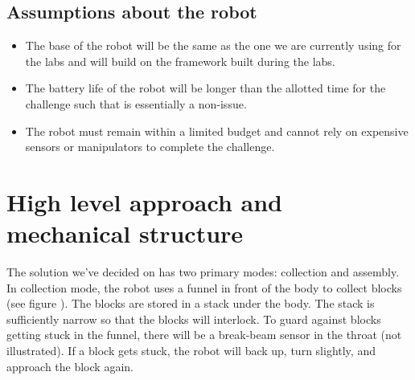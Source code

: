 \documentclass[letterpaper,11pt]{article}
\begin{document}
\subsection{Assumptions about the robot}
\begin{itemize}
 \item The base of the robot will be the same as the one we are currently using for the labs and will build on the framework built during the labs.  
 \item The battery life of the robot will be longer than the allotted time for the challenge such that is essentially a non-issue.
 \item The robot must remain within a limited budget and cannot rely on expensive sensors or manipulators to complete the challenge.
\end{itemize}

\section{High level approach and mechanical structure}
The solution we've decided on has two primary modes: collection and assembly.
In collection mode, the robot uses a funnel in front of the body to collect blocks (see figure ).
The blocks are stored in a stack under the body.
The stack is sufficiently narrow so that the blocks will interlock.
To guard against blocks getting stuck in the funnel,
there will be a break-beam sensor in the throat (not illustrated).
If a block gets stuck, the robot will back up, turn slightly, and approach the block again.
\end{document}
